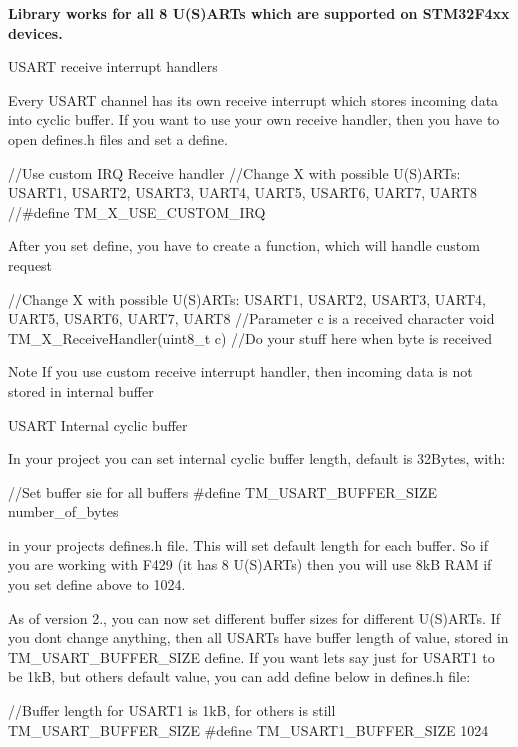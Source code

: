 {\bfseries Library works for all 8 U(\+S)A\+R\+Ts which are supported on S\+T\+M32\+F4xx devices.}

\begin{DoxyParagraph}{U\+S\+A\+R\+T receive interrupt handlers}

\end{DoxyParagraph}
Every U\+S\+A\+R\+T channel has it\textquotesingle{}s own receive interrupt which stores incoming data into cyclic buffer. If you want to use your own receive handler, then you have to open defines.\+h files and set a define. \begin{DoxyVerb}//Use custom IRQ Receive handler
//Change X with possible U(S)ARTs: USART1, USART2, USART3, UART4, UART5, USART6, UART7, UART8
//#define TM_X_USE_CUSTOM_IRQ
\end{DoxyVerb}
 After you set define, you have to create a function, which will handle custom request \begin{DoxyVerb}//Change X with possible U(S)ARTs: USART1, USART2, USART3, UART4, UART5, USART6, UART7, UART8
//Parameter c is a received character
void TM_X_ReceiveHandler(uint8_t c) {
   //Do your stuff here when byte is received
}
\end{DoxyVerb}
 \begin{DoxyNote}{Note}
If you use custom receive interrupt handler, then incoming data is not stored in internal buffer
\end{DoxyNote}
\begin{DoxyParagraph}{U\+S\+A\+R\+T Internal cyclic buffer}

\end{DoxyParagraph}
In your project you can set internal cyclic buffer length, default is 32\+Bytes, with\+: \begin{DoxyVerb}//Set buffer sie for all buffers
#define TM_USART_BUFFER_SIZE number_of_bytes
\end{DoxyVerb}
 in your project\textquotesingle{}s defines.\+h file. This will set default length for each buffer. So if you are working with F429 (it has 8 U(\+S)A\+R\+Ts) then you will use 8k\+B R\+A\+M if you set define above to 1024.

As of version 2., you can now set different buffer sizes for different U(\+S)A\+R\+Ts. If you don\textquotesingle{}t change anything, then all U\+S\+A\+R\+T\textquotesingle{}s have buffer length of value, stored in {\ttfamily T\+M\+\_\+\+U\+S\+A\+R\+T\+\_\+\+B\+U\+F\+F\+E\+R\+\_\+\+S\+I\+Z\+E} define. If you want let\textquotesingle{}s say just for U\+S\+A\+R\+T1 to be 1k\+B, but others default value, you can add define below in defines.\+h file\+: \begin{DoxyVerb}//Buffer length for USART1 is 1kB, for others is still TM_USART_BUFFER_SIZE
#define TM_USART1_BUFFER_SIZE 1024
\end{DoxyVerb}


